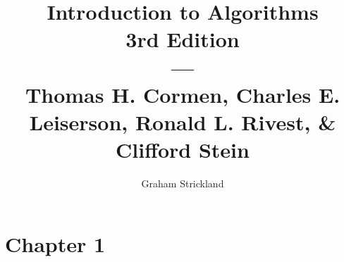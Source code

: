 \documentclass{article}
\title{
    Introduction to Algorithms\\3rd Edition\\---\\
    Thomas H. Cormen, Charles E. Leiserson, Ronald L. Rivest, \& Clifford Stein
}
\author{Graham Strickland}
\begin{document}
\maketitle  

\section*{Chapter 1}

\end{document}
